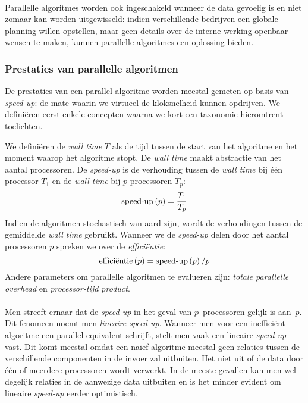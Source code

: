 \paragraph{}
Parallelle algoritmes worden ook ingeschakeld wanneer de data gevoelig is en niet zomaar kan worden uitgewisseld: indien verschillende bedrijven een globale planning willen opstellen, maar geen details over de interne werking openbaar wensen te maken, kunnen parallelle algoritmes een oplossing bieden\cite{Gaspero_amultiagent}.

\subsubsection{Prestaties van parallelle algoritmen}

De prestaties van een parallel algoritme worden meestal gemeten op basis van \emph{speed-up}: de mate waarin we virtueel de kloksnelheid kunnen opdrijven. We defini\"eren eerst enkele concepten waarna we kort een taxonomie hieromtrent toelichten.

\begin{definition}
We defini\"eren de \emph{wall time} $T$ als de tijd tussen de start van het algoritme en het moment waarop het algoritme stopt. De \emph{wall time} maakt abstractie van het aantal processoren. De \emph{speed-up} is de verhouding tussen de \emph{wall time} bij \'e\'en processor $T_1$ en de \emph{wall time} bij $p$ processoren $T_p$:
\begin{equation}
\mbox{speed-up}\left(p\right)=\displaystyle\frac{T_1}{T_p}
\end{equation}
Indien de algoritmen stochastisch van aard zijn, wordt de verhoudingen tussen de gemiddelde \emph{wall time} gebruikt.
Wanneer we de \emph{speed-up} delen door het aantal processoren $p$ spreken we over de \emph{effici\"entie}:
\begin{equation}
\mbox{effici\"entie}\left(p\right)=\mbox{speed-up}\left(p\right)/p
\end{equation}
Andere parameters om parallelle algoritmen te evalueren zijn: \emph{totale parallelle overhead} en \emph{processor-tijd product}\cite{books/bc/KumarGGK94}.
\end{definition}

\paragraph{}
Men streeft ernaar dat de \emph{speed-up} in het geval van $p$~processoren gelijk is aan~$p$. Dit fenomeen noemt men \emph{lineaire speed-up}. Wanneer men voor een ineffici\"ent algoritme een parallel equivalent schrijft, stelt men vaak een lineaire \emph{speed-up} vast. Dit komt meestal omdat een na\"ief algoritme meestal geen relaties tussen de verschillende componenten in de invoer zal uitbuiten. Het niet uit of de data door \'e\'en of meerdere processoren wordt verwerkt. In de meeste gevallen kan men wel degelijk relaties in de aanwezige data uitbuiten en is het minder evident om lineaire \emph{speed-up} eerder optimistisch.


